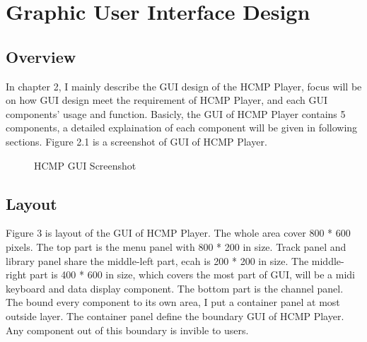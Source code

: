 
\chapter{Graphic User Interface Design} %

\section{Overview}
In chapter 2, I mainly describe the GUI design of the HCMP Player, focus will 
be on how GUI design meet the requirement of HCMP Player, and each GUI components' 
usage and function. Basicly, the GUI of HCMP Player contains 5 components, 
a detailed explaination of each component will be given in following sections. 
Figure 2.1 is a screenshot of GUI of HCMP Player. 

\begin{figure}[H]
\caption{HCMP GUI Screenshot}
\label{fig:speciation}
\end{figure}

\section{Layout}
Figure 3 is layout of the GUI of HCMP Player. The whole area 
cover 800 * 600 pixels. The top part is the menu panel with 800 * 200 in size. 
Track panel and 
library panel share the middle-left part, ecah is 200 * 200 in size. 
The middle-right part is 400 * 600 in size, which covers the most part of GUI, will be   
a midi keyboard and data display component. The bottom part is the channel   
panel. The bound every component to its own area, I put a container panel at most 
outside layer. The container panel define the boundary GUI of HCMP Player. Any 
component out of this boundary is invible to users. 

